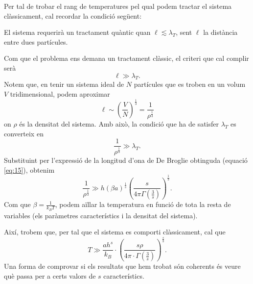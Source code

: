 \documentclass[a4paper, 10pt]{article}
\begin{document}
Per tal de trobar el rang de temperatures pel qual podem tractar el sistema clàssicament, cal recordar la condició següent:
\begin{center}
	El sistema requerirà un tractament quàntic quan $\ell \lesssim \lambda_T$, sent $\ell$ la distància entre dues partícules.
\end{center}
Com que el problema ens demana un tractament clàssic, el criteri que cal complir serà
\begin{equation}
	\ell \gg \lambda_T.
\end{equation}
Notem que, en tenir un sistema ideal de $N$ partícules que es troben en un volum $V$ tridimensional, podem aproximar
\begin{equation*}
	\ell \sim \left(\frac{V}{N}\right)^{\frac{1}{3}}=\frac{1}{\rho^{\frac{1}{3}}}
\end{equation*}
on $\rho$ és la densitat del sistema. Amb això, la condició que ha de satisfer $\lambda_T$ es converteix en
\begin{equation}
	\frac{1}{\rho^{\frac{1}{3}}} \gg \lambda_T.
\end{equation}
Substituint per l'expressió de la longitud d'ona de De Broglie obtinguda (equació \eqref{eq:15}), obtenim
\begin{equation}
	\frac{1}{\rho^{\frac{1}{3}}} \gg h(\beta a)^\frac{1}{s}\left(\frac{s}{4\pi \Gamma(\frac{3}{s})}\right)^{\frac{1}{3}}.
\end{equation}
Com que $\beta = \frac{1}{k_BT}$, podem aïllar la temperatura en funció de tota la resta de variables (els paràmetres característics i la densitat del sistema).

Així, trobem que, per tal que el sistema es comporti clàssicament, cal que
\begin{equation}
	\boxed{T \gg \frac{ah^s}{k_B}\cdot \left(\frac{s\rho}{4\pi\cdot\Gamma\left(\frac{3}{s}\right)}\right)^{\frac{s}{3}}}.
\end{equation}
Una forma de comprovar si els resultats que hem trobat són coherents és veure què passa per a certs valors de $s$ característics. 
\end{document}
